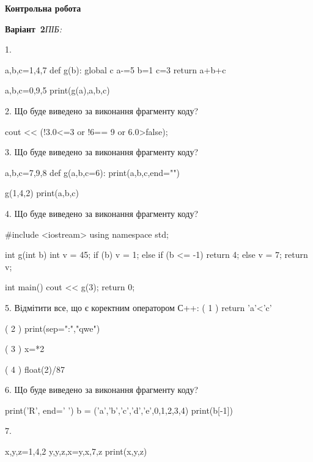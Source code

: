 \documentclass[11pt]{article}
\begin{document}
{\large\textbf{Контрольна робота}}

\textbf{Варіант \No\,2}\hfill \textit{ПІБ:}\,\underline{\hspace{60mm}}
\vspace{4mm}

1. 

a,b,c=1,4,7
def g(b):
global c    a-=5
    b=1
    c=3
    return a+b+c

a,b,c=0,9,5
print(g(a),a,b,c)
\vspace{5mm}

2. Що буде виведено за виконання фрагменту коду?

cout << (!3.0<=3 or !6== 9 or 6.0>false);
\vspace{5mm}

3. Що буде виведено за виконання фрагменту коду?

a,b,c=7,9,8
def g(a,b,c=6):
    print(a,b,c,end="")

g(1,4,2)
print(a,b,c)

\vspace{5mm}

4. Що буде виведено за виконання фрагменту коду?

#include <iostream>
using namespace std;

int g(int b){
    int v = 45;
    if (b) 
        v = 1;
    else if (b <= -1)
         return 4;
    else
         v = 7;
    return v;
}

int main(){
    cout << g(3);
    return 0;
}

\vspace{5mm}

5. %
Відмітити все, що є коректним оператором С++:
( 1 ) return 'a'<'c'

( 2 ) print(sep=":","qwe")

( 3 ) x=*2

( 4 ) float(2)/87
\vspace{5mm}

6. Що буде виведено за виконання фрагменту коду?

print('R', end=' ')
b = ('a','b','c','d','e',0,1,2,3,4)
print(b[-1])

\vspace{5mm}

7. 

x,y,z=1,4,2
y,y,z,x=y,x,7,z
print(x,y,z)
\vspace{5mm}
\end{document}
